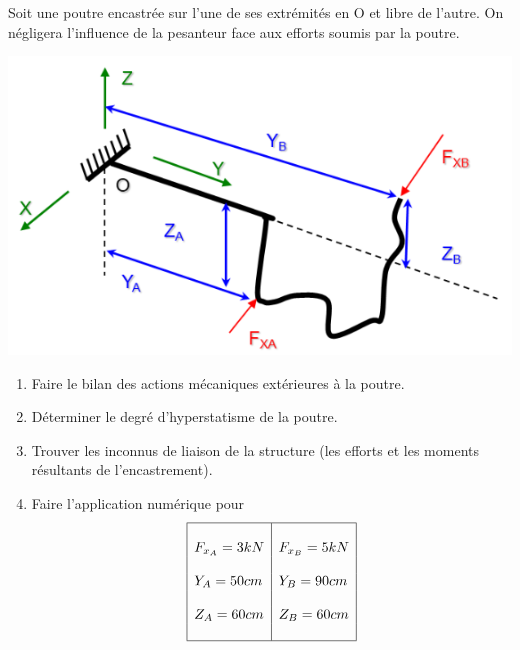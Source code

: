 \documentclass[lecture.tex]{subfiles}
\begin{document}
\exercice{}

Soit une poutre encastrée sur l’une de ses extrémités en O et libre de l’autre. On négligera l’influence de la pesanteur face aux efforts soumis par la poutre.

\begin{center}
  \includegraphics[scale=0.4]{exo-poutre3d.png}
\end{center}

\begin{enumerate}
  \item Faire le bilan des actions mécaniques extérieures à la poutre.
  \item Déterminer le degré d’hyperstatisme de la poutre.
  \item Trouver les inconnus de liaison de la structure (les efforts et les moments résultants de l’encastrement).
  \item Faire l'application numérique pour
  $$\begin{array}{|l|l|}
    \hline
    & \\
    F_{x_A} = 3kN & F_{x_B} = 5kN \\
    & \\
    Y_A = 50cm & Y_B = 90 cm \\
    & \\
    Z_A = 60cm & Z_B = 60 cm \\
    & \\
    \hline
  \end{array}$$
\end{enumerate}

\finexercice
\end{document}
